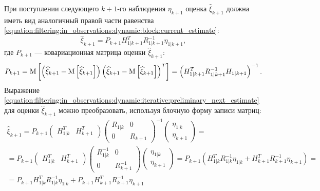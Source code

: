 При поступлении следующего $k+1$-го наблюдения $\eta_{k+1}$ оценка $\widehat{\xi}_{k+1}$ должна иметь вид аналогичный правой части равенства
\eqref{equation:filtering:in_observations:dynamic:block:current_estimate}:
\begin{equation} \label{equation:filtering:in_observations:dynamic:iterative:preliminary_next_estimate}
	\widehat{\xi}_{k+1} = P_{k+1} H_{1|k+1}^T R_{1|k+1}^{-1} \eta_{1|k+1} ,
\end{equation}
где $P_{k+1}$ --- ковариационная матрица оценки $\widehat{\xi}_{k+1}$:
$$
	P_{k+1} = \mathrm{M} \left [ \left ( \widehat{\xi}_{k+1} - \mathrm{M} \left [ \widehat{\xi}_{k+1} \right ] \right ) \left ( \widehat{\xi}_{k+1} - \mathrm{M} \left [ \widehat{\xi}_{k+1} \right ] \right )^T \right ] = \left ( H_{1|k+1}^T R_{1|k+1}^{-1} H_{1|k+1} \right )^{-1} .
$$
Выражение \eqref{equation:filtering:in_observations:dynamic:iterative:preliminary_next_estimate} для оценки $\widehat{\xi}_{k+1}$ можно преобразовать, используя блочную
форму записи матриц:
\begin{multline} \label{equation:filtering:in_observations:dynamic:iterative:preliminary_estimate}
	\widehat{\xi}_{k+1}
	=
		P_{k+1}
		\begin{pmatrix} H_{1|k}^T & H_{k+1}^T \end{pmatrix}
		\begin{pmatrix}
			R_{1|k} & 0 \\
			0       & R_{k+1}
		\end{pmatrix}^{-1}
		\begin{pmatrix}
			\eta_{1|k} \\
			\eta_{k+1}
		\end{pmatrix} = \\
	=
		P_{k+1}
		\begin{pmatrix} H_{1|k}^T & H_{k+1}^T \end{pmatrix}
		\begin{pmatrix}
			R_{1|k}^{-1} & 0 \\
			0                 & R_{k+1}^{-1}
		\end{pmatrix}
		\begin{pmatrix}
			\eta_{1|k} \\
			\eta_{k+1}
		\end{pmatrix}
	= P_{k+1} \left ( H_{1|k}^T R_{1|k}^{-1} \eta_{1|k} + H_{k+1}^T R_{k+1}^{-1} \eta_{k+1} \right ) = \\
	= P_{k+1} H_{1|k}^T R_{1|k}^{-1} \eta_{1|k} + P_{k+1} H_{k+1}^T R_{k+1}^{-1} \eta_{k+1}
\end{multline}

